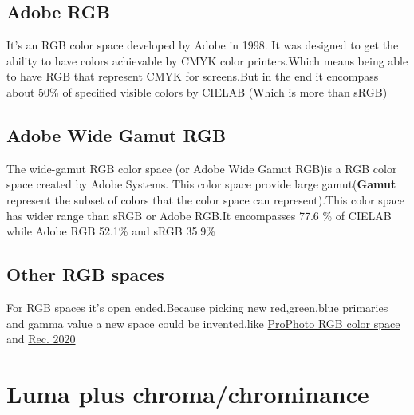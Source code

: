 \documentclass{article}
\begin{document}
\begin{multicols*}{2}
	\subsection*{Adobe RGB}
	It's an RGB color space developed by Adobe in 1998. It was designed to get the ability to have colors achievable by CMYK color printers.Which means being able to have RGB that represent CMYK for screens.But in the end it encompass about 50\% of specified visible colors by CIELAB (Which is more than sRGB) \cite{7}
	\subsection*{Adobe Wide Gamut RGB}
	The wide-gamut RGB color space (or Adobe Wide Gamut RGB)is a RGB color space created by Adobe Systems. This color space provide large gamut(\textbf{Gamut} represent the subset of colors that the color space can represent\cite{9}).This color space has wider range than sRGB or Adobe RGB.It encompasses 77.6 \% of CIELAB while Adobe RGB 52.1\% and sRGB 35.9\% \cite{8}
	\subsection*{Other RGB spaces}
	For RGB spaces it's open ended.Because picking new red,green,blue primaries and gamma value a new space could be invented.like \href{https://en.wikipedia.org/wiki/ProPhoto_RGB_color_space}{ProPhoto RGB color space} and \href{https://en.wikipedia.org/wiki/Rec._2020}{Rec. 2020}\cite{1}
	\section*{Luma plus chroma/chrominance}

\end{multicols*}
\end{document}
